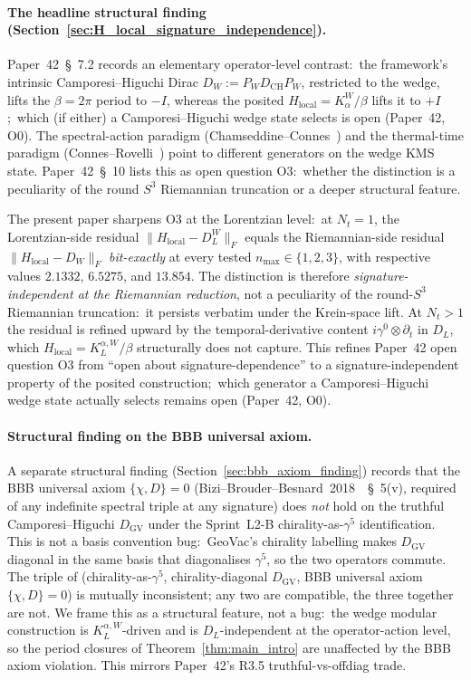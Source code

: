 \documentclass[11pt,a4paper]{article}
\theoremstyle{plain}
\theoremstyle{definition}
\newcommand{\nmax}{n_{\max}}
\newcommand{\Nt}{N_t}
\newcommand{\sthree}{S^{3}}
\newcommand{\Frob}[1]{\lVert #1 \rVert_{F}}
\newcommand{\DCH}{D_{\mathrm{CH}}}
\newcommand{\DGV}{D_{\mathrm{GV}}}
\newcommand{\DL}{D_{L}}
\newcommand{\KL}{K_{L}}
\begin{document}
\paragraph{The headline structural finding (Section~\ref{sec:H_local_signature_independence}).}
Paper~42~\S~7.2 records an elementary operator-level contrast:\ the
framework's intrinsic Camporesi--Higuchi Dirac $D_W := P_W \DCH P_W$,
restricted to the wedge, lifts the $\beta = 2\pi$ period to $-I$,
whereas the posited $H_{\mathrm{local}} = K_\alpha^W / \beta$ lifts it
to $+I$;\ which (if either) a Camporesi--Higuchi wedge state selects is
open (Paper~42, O0). The spectral-action
paradigm (Chamseddine--Connes~\cite{chamseddine_connes2010}) and the
thermal-time paradigm (Connes--Rovelli~\cite{connes_rovelli1994}) point
to different generators on the wedge KMS state. Paper~42~\S~10 lists
this as open question O3:\ whether the distinction is a peculiarity of
the round $\sthree$ Riemannian truncation or a deeper structural
feature.

The present paper sharpens O3 at the Lorentzian level:\ at $\Nt = 1$,
the Lorentzian-side residual $\Frob{H_{\mathrm{local}} - \DL^W}$
equals the Riemannian-side residual
$\Frob{H_{\mathrm{local}} - D_W}$ \emph{bit-exactly} at every tested
$\nmax \in \{1, 2, 3\}$, with respective values $2.1332$, $6.5275$, and
$13.854$. The distinction is therefore \emph{signature-independent at
the Riemannian reduction}, not a peculiarity of the round-$\sthree$
Riemannian truncation:\ it persists verbatim under the Krein-space
lift. At $\Nt > 1$ the residual is refined upward by the
temporal-derivative content $i \gamma^0 \otimes \partial_t$ in $\DL$,
which $H_{\mathrm{local}} = \KL^{\alpha, W}/\beta$ structurally does
not capture. This refines Paper~42 open question O3 from ``open about
signature-dependence'' to a signature-independent property of the
posited construction;\ which generator a Camporesi--Higuchi wedge
state actually selects remains open (Paper~42, O0).

\paragraph{Structural finding on the BBB universal axiom.}
A separate structural finding (Section~\ref{sec:bbb_axiom_finding})
records that the BBB universal axiom $\{\chi, D\} = 0$
(Bizi--Brouder--Besnard~2018~\cite{bizi_brouder_besnard2018}~\S~5(v),
required of any indefinite spectral triple at any signature) does
\emph{not} hold on the truthful Camporesi--Higuchi $\DGV$ under the
Sprint~L2-B chirality-as-$\gamma^5$ identification. This is not a basis
convention bug:\ GeoVac's chirality labelling makes $\DGV$ diagonal in
the same basis that diagonalises $\gamma^5$, so the two operators
commute. The triple of (chirality-as-$\gamma^5$,
chirality-diagonal $\DGV$, BBB universal axiom $\{\chi, D\} = 0$) is
mutually inconsistent; any two are compatible, the three together are
not. We frame this as a structural feature, not a bug:\ the wedge
modular construction is $\KL^{\alpha, W}$-driven and is
$\DL$-independent at the operator-action level, so the period closures
of Theorem~\ref{thm:main_intro} are unaffected by the BBB axiom
violation. This mirrors Paper~42's R3.5 truthful-vs-offdiag
trade.
\end{document}
